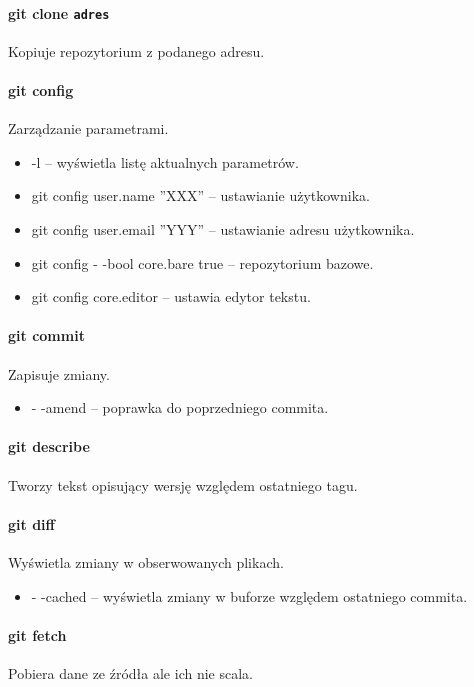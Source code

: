 \paragraph{git clone \texttt{adres}\\}
Kopiuje repozytorium z podanego adresu.

\paragraph{git config\\}
Zarządzanie parametrami.
\begin{itemize}
	\item -l -- wyświetla listę aktualnych parametrów.
	\item git config user.name ''XXX'' -- ustawianie użytkownika.
	\item git config user.email ''YYY'' -- ustawianie adresu użytkownika.
	\item git config - -bool core.bare true -- repozytorium bazowe.
	\item git config core.editor -- ustawia edytor tekstu.
\end{itemize}

\paragraph{git commit}
Zapisuje zmiany.
\begin{itemize}
	\item - -amend -- poprawka do poprzedniego commita.
\end{itemize}

\paragraph{git describe\\}
Tworzy tekst opisujący wersję względem ostatniego tagu.

\paragraph{git diff\\}
Wyświetla zmiany w obserwowanych plikach.
\begin{itemize}
	\item - -cached -- wyświetla zmiany w buforze względem ostatniego commita.
\end{itemize}

\paragraph{git fetch\\}
Pobiera dane ze źródła ale ich nie scala.

